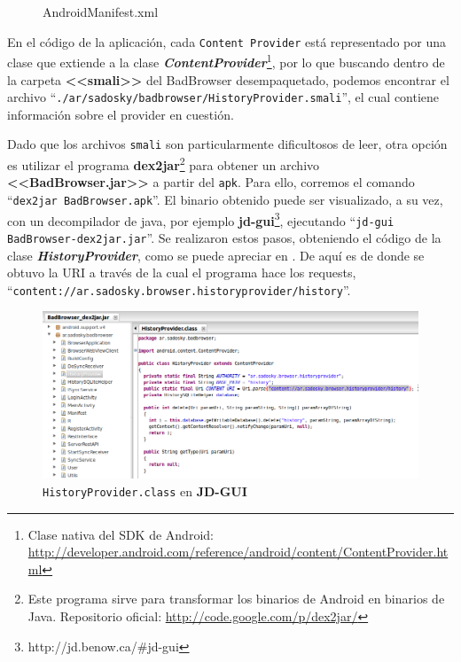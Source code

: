 \documentclass[11pt, a4paper, twoside]{article}
\begin{document}
\begin{figure}[H]

\caption{AndroidManifest.xml}
\label{fig:AndroidManifest}
\end{figure}

En el código de la aplicación, cada \texttt{Content Provider} está representado por una clase que extiende a la clase \textbf{\emph{ContentProvider}}\footnote{Clase nativa del SDK de Android: \url{http://developer.android.com/reference/android/content/ContentProvider.html}}, por lo que buscando dentro de la carpeta \textbf{<<smali>>} del BadBrowser desempaquetado, podemos encontrar el archivo ``\texttt{./ar/sadosky/badbrowser/HistoryProvider.smali}'', el cual contiene información sobre el provider en cuestión. 

Dado que los archivos \texttt{smali} son particularmente dificultosos de leer, otra opción es utilizar el programa \textbf{dex2jar}\footnote{Este programa sirve para transformar los binarios de Android en binarios de Java. Repositorio oficial: \url{http://code.google.com/p/dex2jar/}} para obtener un archivo \textbf{<<BadBrowser.jar>>} a partir del \texttt{apk}. Para ello, corremos el comando ``\texttt{dex2jar BadBrowser.apk}''. El binario obtenido puede ser visualizado, a su vez, con un decompilador de java, por ejemplo \textbf{jd-gui}\footnote{http://jd.benow.ca/\#jd-gui}, ejecutando ``\texttt{jd-gui BadBrowser-dex2jar.jar}''. Se realizaron estos pasos, obteniendo el código de la clase \textbf{\emph{HistoryProvider}}, como se puede apreciar en . De aquí es de donde se obtuvo la URI a través de la cual el programa hace los requests, ``\texttt{\color{blue}content://ar.sadosky.browser.historyprovider/history}''.

\begin{center}
\begin{figure}[H]
\includegraphics[scale=0.475]{historyprovider-jdgui.png}
\caption{\texttt{HistoryProvider.class} en \textbf{JD-GUI}}
\label{fig:historyprovider-jdgui}
\end{figure}
\end{center}
\end{document}
